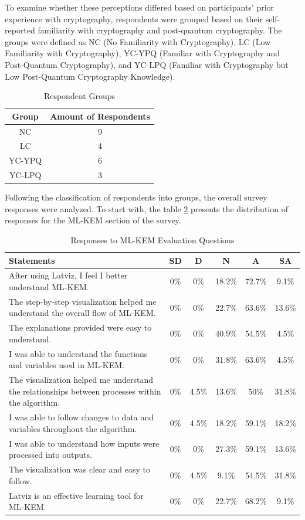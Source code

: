 \documentclass[runningheads]{llncs}
\begin{document}
To examine whether these perceptions differed based on participants' prior experience with cryptography, respondents were grouped based on their self-reported familiarity with cryptography and post-quantum cryptography. The groups were defined as NC (No Familiarity with Cryptography), LC (Low Familiarity with Cryptography), YC-YPQ (Familiar with Cryptography and Post-Quantum Cryptography), and YC-LPQ (Familiar with Cryptography but Low Post-Quantum Cryptography Knowledge).

\begin{table}[H]
\centering
\caption{Respondent Groups}
\label{tab:respondentgroups}
\begin{tabular}{|c|c|} 
 \hline
 Group & Amount of Respondents \\ [0.5ex]
 \hline
 NC & 9 \\
 \hline
 LC & 4 \\
 \hline
 YC-YPQ & 6 \\
 \hline
 YC-LPQ & 3 \\
 \hline
\end{tabular}
\end{table}

Following the classification of respondents into groups, the overall survey responses were analyzed. To start with, the table \ref{tab:mlkemresults} presents the distribution of responses for the ML-KEM section of the survey.

\begin{table}[H]
\centering
\caption{Responses to ML-KEM Evaluation Questions}
\label{tab:mlkemresults}
\begin{tabular}{|p{7cm}|c|c|c|c|c|}
\hline
Statements & SD & D & N & A & SA \\
\hline
After using Latviz, I feel I better understand ML-KEM. & 0\% & 0\% & 18.2\% & 72.7\% & 9.1\% \\
\hline
The step-by-step visualization helped me understand the overall flow of ML-KEM. & 0\% & 0\% & 22.7\% & 63.6\% & 13.6\% \\
\hline
The explanations provided were easy to understand. & 0\% & 0\% & 40.9\% & 54.5\% & 4.5\% \\
\hline
I was able to understand the functions and variables used in ML-KEM. & 0\% & 0\% & 31.8\% & 63.6\% & 4.5\% \\
\hline
The visualization helped me understand the relationships between processes within the algorithm. & 0\% & 4.5\% & 13.6\% & 50\% & 31.8\% \\
\hline
I was able to follow changes to data and variables throughout the algorithm. & 0\% & 4.5\% & 18.2\% & 59.1\% & 18.2\% \\
\hline
I was able to understand how inputs were processed into outputs. & 0\% & 0\% & 27.3\% & 59.1\% & 13.6\% \\
\hline
The visualization was clear and easy to follow. & 0\% & 4.5\% & 9.1\% & 54.5\% & 31.8\% \\
\hline
Latviz is an effective learning tool for ML-KEM. & 0\% & 0\% & 22.7\% & 68.2\% & 9.1\% \\
\hline
\end{tabular}
\end{table}
\end{document}
